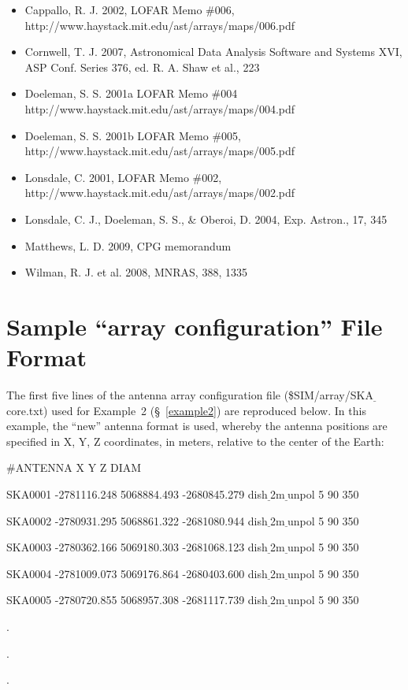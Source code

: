\documentclass[12pt,psfig]{article}
\begin{document}
\begin{itemize}
\item Cappallo, R. J. 2002, LOFAR Memo \#006,\\
http://www.haystack.mit.edu/ast/arrays/maps/006.pdf

\item  Cornwell, T. J. 2007, Astronomical Data Analysis
Software and Systems XVI, ASP Conf. Series 376, ed. R. A. Shaw et al.,
223

\item Doeleman, S. S. 2001a
LOFAR Memo \#004\\
http://www.haystack.mit.edu/ast/arrays/maps/004.pdf

\item Doeleman, S. S. 2001b
LOFAR Memo \#005,\\
http://www.haystack.mit.edu/ast/arrays/maps/005.pdf

\item Lonsdale, C. 2001, LOFAR Memo \#002,\\
http://www.haystack.mit.edu/ast/arrays/maps/002.pdf


\item Lonsdale, C. J., Doeleman, S. S., \& Oberoi, D. 2004,
Exp. Astron., 17, 345

\item Matthews, L. D. 2009, CPG memorandum

\item Wilman, R. J. et al. 2008, MNRAS, 388, 1335

\end{itemize}

\appendix
%
\section{Sample ``array configuration'' File Format\protect\label{arraysamp}}
%
The first five lines of the antenna array configuration file ({\sf \$SIM/array/SKA$\underline~$core.txt}) used for
Example~2 (\S~\ref{example2}) are reproduced below.
In this example, the ``new'' antenna format is used, whereby the 
antenna positions
are specified in X, Y, Z coordinates, in meters, relative to the center of the
Earth:

\smallskip
\begin{flushleft}


\#ANTENNA   X           Y            Z        DIAM

SKA0001 -2781116.248 5068884.493 -2680845.279  dish$\underline~$2m$\underline~$unpol  5  90  350

SKA0002 -2780931.295 5068861.322 -2681080.944  dish$\underline~$2m$\underline~$unpol  5  90  350

SKA0003 -2780362.166 5069180.303 -2681068.123  dish$\underline~$2m$\underline~$unpol  5  90  350

SKA0004 -2781009.073 5069176.864 -2680403.600  dish$\underline~$2m$\underline~$unpol  5  90  350

SKA0005 -2780720.855 5068957.308 -2681117.739  dish$\underline~$2m$\underline~$unpol  5  90  350

.

.

.
\end{flushleft}
\end{document}
